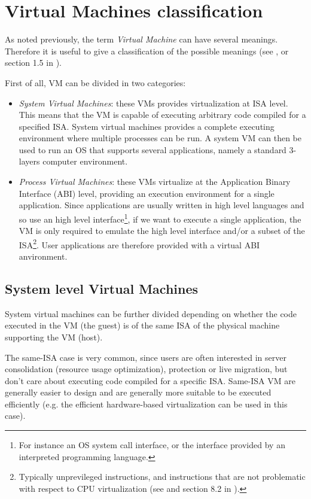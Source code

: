 \section{Virtual Machines classification}
\label{sec:vmclass}

As noted previously, the term \emph{Virtual Machine} can have several meanings. Therefore it is useful to give
a classification of the possible meanings (see \cite{ref:vmclassification}, or section 1.5 in \cite{ref:vmbook}).

First of all, VM can be divided in two categories:
\begin{itemize}
    \item \emph{System Virtual Machines}: these VMs provides virtualization at ISA level. This means that the VM is capable of executing 
	  arbitrary code compiled for a specified ISA.  System virtual machines provides a complete executing environment where
	  multiple processes can be run.
	  A system VM can then be used to run an OS that supports several applications, namely a standard 3-layers computer
	  environment.
	  
    \item \emph{Process Virtual Machines}: these VMs virtualize at the Application Binary Interface (ABI) level, providing
	  an execution environment for a single application. Since
	  applications are usually written in high level languages and so use an high level interface\footnote{For instance an OS 
	  system call interface, or the interface provided by an interpreted programming language.}, if we want to execute a single
	  application, the VM is only required to emulate the high level interface and/or a subset of the ISA\footnote{Typically 
	  unprevileged instructions, and instructions that are not problematic with respect to CPU virtualization (see \cite{ref:x86-virt}
	  and section 8.2 in \cite{ref:vmbook}).}. User applications are therefore provided with a virtual ABI anvironment.
\end{itemize}

\subsection{System level Virtual Machines}
System virtual machines can be further divided depending on whether the code executed in the VM (the guest) is of the same ISA
of the physical machine supporting the VM (host).

The same-ISA case is very common, since users are often interested in server consolidation (resource usage optimization), protection or
live migration, but don't care about executing code compiled for a specific ISA. Same-ISA VM are generally easier to design and 
are generally more suitable to be executed efficiently (e.g. the efficient hardware-based virtualization can be used in this case).

